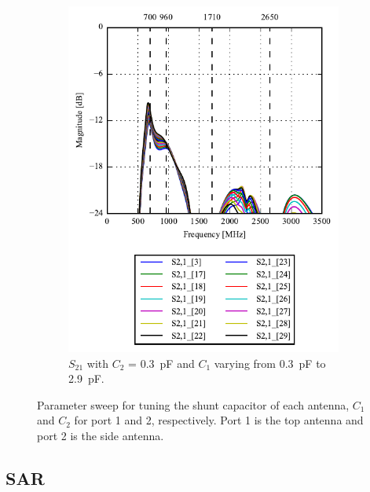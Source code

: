 \begin{figure}[htbp]
\begin{subfigure}[b]{0.49\linewidth}
        \includegraphics{img/tech_sol/monopole/talk_mode/s21_s22}
        \caption{$S_{21}$ with $C_2$ = \SI{0.3}{pF} and $C_1$ varying from \SI{0.3}{pF} to \SI{2.9}{pF}.}
        \label{fig:ant1_s22}
    \end{subfigure}
    \caption{Parameter sweep for tuning the shunt capacitor of each antenna, $C_1$ and $C_2$ for port 1 and 2, respectively. Port 1 is the top antenna and port 2 is the side antenna.}
    \label{fig:sparam_mono}
\end{figure}

\subsection{SAR}

